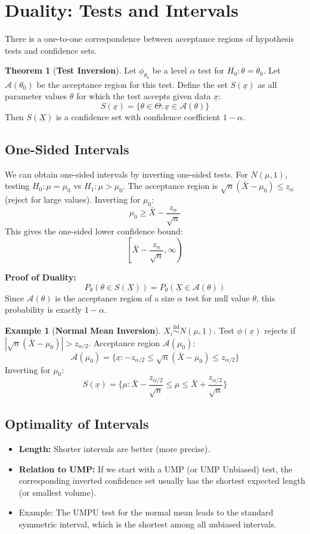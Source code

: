 \documentclass[12pt, a4paper]{article}
\theoremstyle{definition}
\newtheorem{example}{Example}
\newtheorem{theorem}{Theorem}
\newcommand{\iid}{\overset{\text{iid}}{\sim}}
\newcommand{\xvec}{\underline{x}}
\newcommand{\Xvec}{\underline{X}}
\begin{document}
\section{Duality: Tests and Intervals}

There is a one-to-one correspondence between acceptance regions of hypothesis tests and confidence sets.

\begin{theorem}[\textbf{Test Inversion}]
Let $\phi_{\theta_0}$ be a level $\alpha$ test for $H_0: \theta = \theta_0$.
Let $\mathcal{A}(\theta_0)$ be the acceptance region for this test.
Define the set $S(\xvec)$ as all parameter values $\theta$ for which the test accepts given data $\xvec$:
$$ S(\xvec) = \{ \theta \in \Theta : \xvec \in \mathcal{A}(\theta) \} $$
Then $S(\Xvec)$ is a confidence set with confidence coefficient $1 - \alpha$.
\end{theorem}

\subsection{One-Sided Intervals}
We can obtain one-sided intervals by inverting one-sided tests.
For $N(\mu, 1)$, testing $H_0: \mu = \mu_0$ vs $H_1: \mu > \mu_0$.
The acceptance region is $\sqrt{n}(\bar{X} - \mu_0) \le z_\alpha$ (reject for large values).
Inverting for $\mu_0$:
$$ \mu_0 \ge \bar{X} - \frac{z_\alpha}{\sqrt{n}} $$
This gives the one-sided lower confidence bound:
$$ \left[ \bar{X} - \frac{z_\alpha}{\sqrt{n}}, \infty \right) $$

\textbf{Proof of Duality:}
$$ P_\theta(\theta \in S(\Xvec)) = P_\theta(\Xvec \in \mathcal{A}(\theta)) $$
Since $\mathcal{A}(\theta)$ is the acceptance region of a size $\alpha$ test for null value $\theta$, this probability is exactly $1 - \alpha$.

\begin{example}[\textbf{Normal Mean Inversion}]
$X_i \iid N(\mu, 1)$. Test $\phi(\xvec)$ rejects if $|\sqrt{n}(\bar{X} - \mu_0)| > z_{\alpha/2}$.
Acceptance region $\mathcal{A}(\mu_0)$:
$$ \mathcal{A}(\mu_0) = \{ \xvec : -z_{\alpha/2} \le \sqrt{n}(\bar{X} - \mu_0) \le z_{\alpha/2} \} $$
Inverting for $\mu_0$:
$$ S(\xvec) = \{ \mu : \bar{X} - \frac{z_{\alpha/2}}{\sqrt{n}} \le \mu \le \bar{X} + \frac{z_{\alpha/2}}{\sqrt{n}} \} $$
\end{example}

\subsection{Optimality of Intervals}
\begin{itemize}
    \item \textbf{Length:} Shorter intervals are better (more precise).
    \item \textbf{Relation to UMP:} If we start with a UMP (or UMP Unbiased) test, the corresponding inverted confidence set usually has the shortest expected length (or smallest volume).
    \item Example: The UMPU test for the normal mean leads to the standard symmetric interval, which is the shortest among all unbiased intervals.
\end{itemize}
\end{document}
